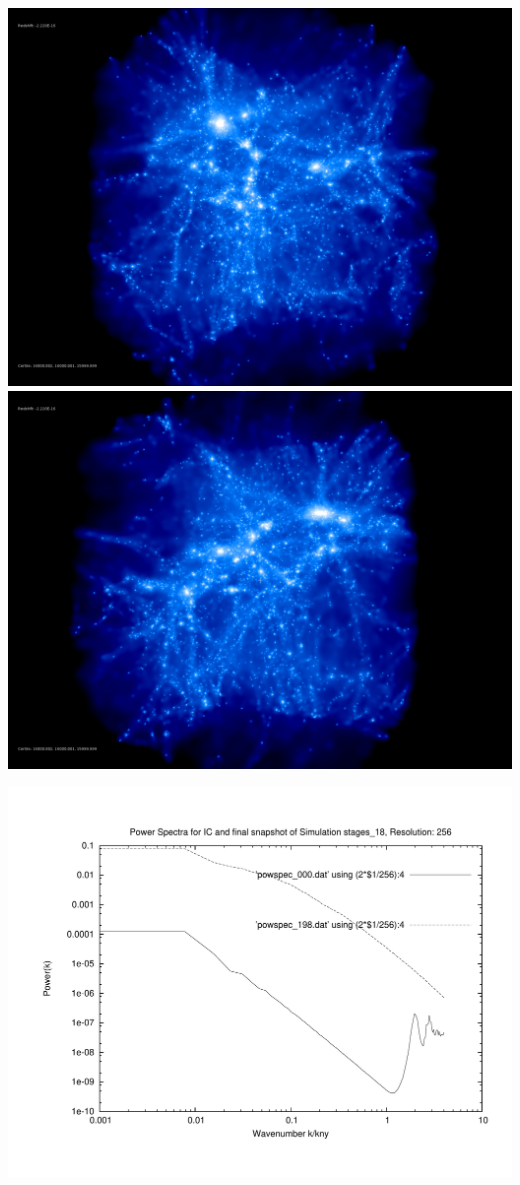 \includegraphics[scale=0.1]{r256/stages_18/rotate_00074.jpg} 
\includegraphics[scale=0.1]{r256/stages_18/rotate_00131.jpg}

\includegraphics[scale=0.5]{r256/stages_18/plot_powspec_stages_18}


